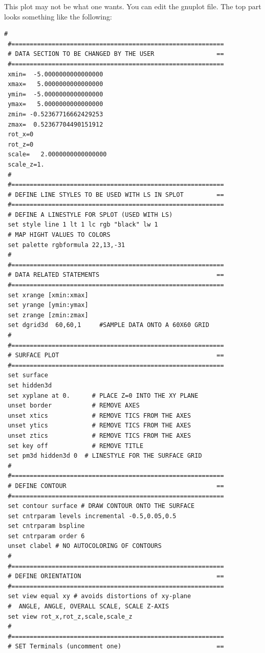 \documentclass[final,12pt,makeidx,DIV=calc]{article}
\begin{document}
{{{{{{This plot may not be what one wants. You can edit the gnuplot
file. The top part looks something like the following: 
{\tiny\begin{verbatim}
#
 #==========================================================
 # DATA SECTION TO BE CHANGED BY THE USER                 ==
 #==========================================================
 xmin=  -5.0000000000000000     
 xmax=   5.0000000000000000     
 ymin=  -5.0000000000000000     
 ymax=   5.0000000000000000     
 zmin= -0.52367716662429253     
 zmax=  0.52367704490151912     
 rot_x=0
 rot_z=0
 scale=   2.0000000000000000     
 scale_z=1.
 #
 #==========================================================
 # DEFINE LINE STYLES TO BE USED WITH LS IN SPLOT         ==
 #==========================================================
 # DEFINE A LINESTYLE FOR SPLOT (USED WITH LS)
 set style line 1 lt 1 lc rgb "black" lw 1
 # MAP HIGHT VALUES TO COLORS
 set palette rgbformula 22,13,-31
 #
 #==========================================================
 # DATA RELATED STATEMENTS                                ==
 #==========================================================
 set xrange [xmin:xmax]
 set yrange [ymin:ymax]
 set zrange [zmin:zmax]
 set dgrid3d  60,60,1     #SAMPLE DATA ONTO A 60X60 GRID
 #
 #==========================================================
 # SURFACE PLOT                                           ==
 #==========================================================
 set surface
 set hidden3d
 set xyplane at 0.      # PLACE Z=0 INTO THE XY PLANE
 unset border           # REMOVE AXES
 unset xtics            # REMOVE TICS FROM THE AXES
 unset ytics            # REMOVE TICS FROM THE AXES
 unset ztics            # REMOVE TICS FROM THE AXES
 set key off            # REMOVE TITLE
 set pm3d hidden3d 0  # LINESTYLE FOR THE SURFACE GRID
 #
 #==========================================================
 # DEFINE CONTOUR                                         ==
 #==========================================================
 set contour surface # DRAW CONTOUR ONTO THE SURFACE
 set cntrparam levels incremental -0.5,0.05,0.5
 set cntrparam bspline
 set cntrparam order 6
 unset clabel # NO AUTOCOLORING OF CONTOURS
 #
 #==========================================================
 # DEFINE ORIENTATION                                     ==
 #==========================================================
 set view equal xy # avoids distortions of xy-plane
 #  ANGLE, ANGLE, OVERALL SCALE, SCALE Z-AXIS
 set view rot_x,rot_z,scale,scale_z
 #
 #==========================================================
 # SET Terminals (uncomment one)                          ==

\end{verbatim}}}}}}}}
\end{document}
